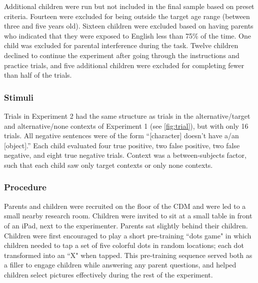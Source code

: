 \documentclass[man, noapacite]{apa2}
\begin{document}
Additional children were run but not included in the final sample based on preset criteria. Fourteen were excluded for being outside the target age range (between three and five years old). Sixteen children were excluded based on having parents who indicated that they were exposed to English less than 75\% of the time. One child was excluded for parental interference during the task. Twelve children declined to continue the experiment after going through the instructions and practice trials, and five additional children were excluded for completing fewer than half of the trials.

\subsubsection{Stimuli}

Trials in Experiment 2 had the same structure as trials in the alternative/target and alternative/none contexts of Experiment 1 (see \ref{fig:trial}), but with only 16 trials. All negative sentences were of the form ``[character] doesn't have a/an [object].'' Each child evaluated four true positive, two false positive, two false negative, and eight true negative trials. Context was a between-subjects factor, such that each child saw only target contexts or only none contexts.

\subsubsection{Procedure}

Parents and children were recruited on the floor of the CDM and were led to a small nearby research room. Children were invited to sit at a small table in front of an iPad, next to the experimenter. Parents sat slightly behind their children. Children were first encouraged to play a short pre-training ``dots game" in which children needed to tap a set of five colorful dots in random locations; each dot transformed into an ``X" when tapped. This pre-training sequence served both as a filler to engage children while answering any parent questions, and helped children select pictures effectively during the rest of the experiment.
\end{document}
